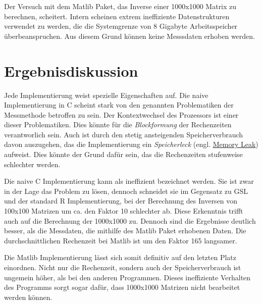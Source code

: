Der Versuch mit dem Matlib Paket, das Inverse einer 1000x1000 Matrix zu berechnen, scheitert. Intern scheinen extrem ineffiziente Datenstrukturen verwendet zu werden, die die Systemgrenze von 8 Gigabyte Arbeitsspeicher überbeanspruchen. Aus diesem Grund können keine Messsdaten erhoben werden.

\newpage
\section{Ergebnisdiskussion}
Jede Implementierung weist spezielle Eigenschaften auf.
Die naive Implementierung in C scheint stark von den genannten Problematiken der Messmethode betroffen zu sein. Der Kontextwechsel des Prozessors ist einer dieser Problematiken. Dies könnte für die \emph{Blockformung} der Rechenzeiten verantworlich sein.  Auch ist durch den stetig ansteigenden Speicherverbrauch davon auszugehen, das die Implementierung ein \emph{Speicherleck} (engl. \href{https://en.wikipedia.org/wiki/Memory_leak}{Memory Leak}) aufweist. Dies könnte der Grund dafür sein, das die Rechenzeiten stufenweise schlechter werden.

Die naive C Implementierung kann als ineffizient bezeichnet werden. Sie ist zwar in der Lage das Problem zu lösen, dennoch schneidet sie im Gegensatz zu GSL und der standard R Implementierung, bei der Berechnung des Inversen von 100x100 Matrizen um ca. den Faktor 10 schlechter ab. Diese Erkenntnis trifft auch auf die Berechnung der 1000x1000 zu. Dennoch sind die Ergebnisse deutlich besser, als die Messdaten, die mithilfe des Matlib Paket erhobenen Daten. Die durchschnittlichen Rechenzeit bei Matlib ist um den Faktor 165 langsamer.

Die Matlib Implementierung lässt sich somit definitiv auf den letzten Platz einordnen. Nicht nur die Rechenzeit, sondern auch der Speicherverbrauch ist ungemein höher, als bei den anderen Programmen. Dieses ineffiziente Verhalten des Programms sorgt sogar dafür, dass 1000x1000 Matrizen nicht bearbeitet werden können.

